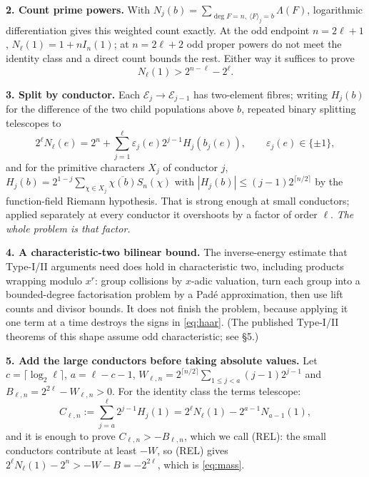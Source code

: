\documentclass[10pt]{article}
\newcommand{\E}{\mathcal E}
\begin{document}
\textbf{2. Count prime powers.} With
$N_j(b)=\sum_{\deg F=n,\ \langle F\rangle_j=b}\Lambda(F)$, logarithmic
differentiation gives this weighted count exactly. At the odd endpoint
$n=2\ell+1$, $N_\ell(1)=1+nI_n(1)$; at $n=2\ell+2$ odd proper powers do not
meet the identity class and a direct count bounds the rest. Either way it
suffices to prove
\begin{equation}\label{eq:mass}
 N_\ell(1)>2^{n-\ell}-2^\ell.
\end{equation}

\textbf{3. Split by conductor.} Each $\E_j\to\E_{j-1}$ has two-element fibres;
writing $H_j(b)$ for the difference of the two child populations above $b$,
repeated binary splitting telescopes to
\begin{equation}\label{eq:haar}
 2^\ell N_\ell(e)=2^n+\sum_{j=1}^{\ell}\varepsilon_j(e)2^{j-1}H_j(b_j(e)),
 \qquad\varepsilon_j(e)\in\{\pm1\},
\end{equation}
and for the primitive characters $X_j$ of conductor $j$,
$H_j(b)=2^{1-j}\sum_{\chi\in X_j}\overline{\chi(b)}S_n(\chi)$ with
$|H_j(b)|\leq(j-1)2^{\lceil n/2\rceil}$ by the function-field Riemann
hypothesis. That is strong enough at small conductors; applied separately at
every conductor it overshoots by a factor of order $\ell$. \emph{The whole
problem is that factor.}

\textbf{4. A characteristic-two bilinear bound.} The inverse-energy estimate
that Type-I/II arguments need does hold in characteristic two, including
products wrapping modulo $x^r$: group collisions by $x$-adic valuation, turn
each group into a bounded-degree factorisation problem by a Pad\'e
approximation, then use lift counts and divisor bounds. It does not finish the
problem, because applying it one term at a time destroys the signs in
\eqref{eq:haar}. (The published Type-I/II theorems of this shape assume odd
characteristic; see \S5.)

\textbf{5. Add the large conductors before taking absolute values.} Let
$c=\lceil\log_2\ell\rceil$, $a=\ell-c-1$,
$W_{\ell,n}=2^{\lceil n/2\rceil}\sum_{1\leq j<a}(j-1)2^{j-1}$ and
$B_{\ell,n}=2^{2\ell}-W_{\ell,n}>0$. For the identity class the terms
telescope:
\begin{equation}\label{eq:rel}
 C_{\ell,n}:=\sum_{j=a}^{\ell}2^{j-1}H_j(1)
 =2^\ell N_\ell(1)-2^{a-1}N_{a-1}(1),
\end{equation}
and it is enough to prove $C_{\ell,n}>-B_{\ell,n}$, which we call (REL): the
small conductors contribute at least $-W$, so (REL) gives
$2^\ell N_\ell(1)-2^n>-W-B=-2^{2\ell}$, which is \eqref{eq:mass}.
\end{document}
